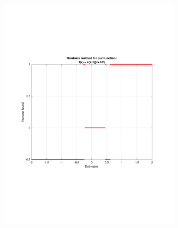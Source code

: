 \documentclass[12pt]{article} %
\begin{document}
\begin{figure}[ht!]
    \centering
    \begin{subfigure}{0.4\textwidth}
        \includegraphics[width=\textwidth]{fig0.pdf}
        \caption{\small}
        \label{}
    \end{subfigure}
    \begin{subfigure}{0.4\textwidth}

\end{subfigure}
\end{figure}
\end{document}
